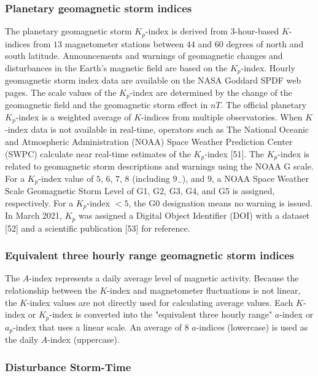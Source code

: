 \let\LaTeXcline\cline\documentclass[sn-mathphys-num]{sn-jnl}\let\cline\LaTeXcline
\begin{document}
\subsubsection{Planetary geomagnetic storm indices}

The planetary geomagnetic storm $K_{p}$-index is derived from $3$-hour-based $K$-indices from $13$ magnetometer stations between $44$ and $60$ degrees of north and south latitude. Announcements and warnings of geomagnetic changes and disturbances in the Earth's magnetic field are based on the $K_{p}$-index. Hourly geomagnetic storm index data are available on the NASA Goddard SPDF web pages. The scale values of the $K_{p}$-index are determined by the change of the geomagnetic field and the geomagnetic storm effect in $nT$. The official planetary $K_{p}$-index is a weighted average of $K$-indices from multiple observatories. When $K$-index data is not available in real-time, operators such as The National Oceanic and Atmospheric Administration (NOAA) Space Weather Prediction Center (SWPC) calculate near real-time estimates of the $K_{p}$-index [51]. The $K_{p}$-index is related to geomagnetic storm descriptions and warnings using the NOAA G scale. For a $K_{p}$-index value of $5$, $6$, $7$, $8$ (including $9_{-}$), and $9$, a NOAA Space Weather Scale Geomagnetic Storm Level of G1, G2, G3, G4, and G5 is assigned, respectively. For a $K_{p}$-index $<5$, the G0 designation means no warning is issued. In March 2021, $K_{p}$ was assigned a Digital Object Identifier (DOI) with a dataset [52] and a scientific publication [53] for reference.

\subsubsection{Equivalent three hourly range geomagnetic storm indices}

The $A$-index represents a daily average level of magnetic activity. Because the relationship between the $K$-index and magnetometer fluctuations is not linear, the $K$-index values are not directly used for calculating average values. Each $K$-index or $K_{p}$-index is converted into the "equivalent three hourly range" $a$-index or $a_{p}$-index that uses a linear scale. An average of $8$ $a$-indices (lowercase) is used as the daily $A$-index (uppercase).  

\subsubsection{Disturbance Storm-Time}
\end{document}
